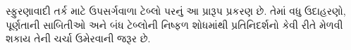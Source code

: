 \documentclass[../../../include/open-logic-chapter]{subfiles}
\begin{document}

\begin{editorial}
  સ્ફુરણાવાદી તર્ક માટે ઉપસર્ગવાળા ટેબ્લો પરનું આ પ્રારૂપ
  પ્રકરણ છે. તેમાં વધુ ઉદાહરણો, પૂર્ણતાની સાબિતીઓ અને
  બંધ ટેબ્લોની નિષ્ફળ શોધમાંથી પ્રતિનિદર્શનો કેવી રીતે
  મેળવી શકાય તેની ચર્ચા ઉમેરવાની જરૂર છે.
\end{editorial}


\OLEndChapterHook
\end{document}

